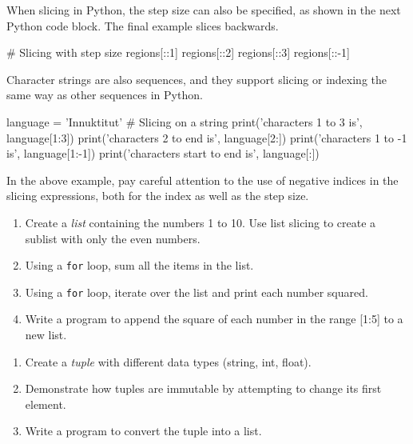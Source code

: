 When slicing in Python, the step size can also be specified, as shown in the next Python code block. The final example slices backwards.

\begin{pythoncode}
# Slicing with step size
regions[::1]
regions[::2]
regions[::3]
regions[::-1]
\end{pythoncode}

Character strings are also sequences, and they support slicing or indexing the same way as other sequences in Python.

\begin{pythoncode}
language = 'Innuktitut'
# Slicing on a string 
print('characters 1 to 3 is', language[1:3])
print('characters 2 to end is', language[2:])
print('characters 1 to -1 is', language[1:-1])
print('characters start to end is', language[:])
\end{pythoncode}

\noindent In the above example, pay careful attention to the use of negative indices in the slicing expressions, both for the index as well as the step size.


\begin{exerciseboxcomputer}
\begin{enumerate}
    \item Create a \emph{list} containing the numbers 1 to 10. Use list slicing to create a sublist with only the even numbers.
    \item Using a \texttt{for} loop, sum all the items in the list.
    \item Using a \texttt{for} loop, iterate over the list and print each number squared.
    \item Write a program to append the square of each number in the range [1:5] to a new list.
\end{enumerate}
\end{exerciseboxcomputer}

\begin{exerciseboxcomputer}
\begin{enumerate}
    \item Create a \emph{tuple} with different data types (string, int, float).
    \item Demonstrate how tuples are immutable by attempting to change its first element.
    \item Write a program to convert the tuple into a list.
\end{enumerate}
\end{exerciseboxcomputer}

